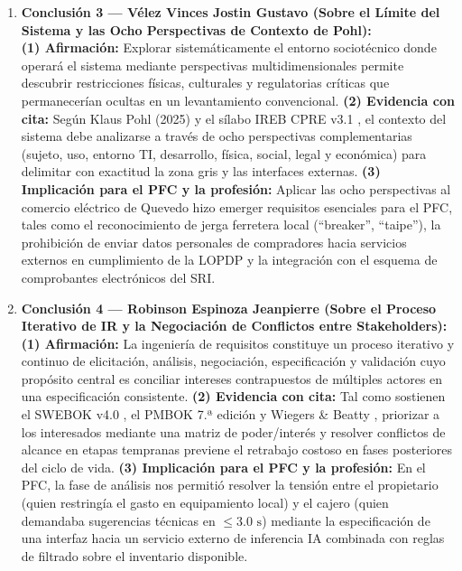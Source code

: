 \documentclass[conference,10pt]{IEEEtran}
\begin{document}
\begin{enumerate}
		\item \textbf{Conclusión 3 --- Vélez Vinces Jostin Gustavo (Sobre el Límite del Sistema y las Ocho Perspectivas de Contexto de Pohl):} \\
		\textbf{(1) Afirmación:} Explorar sistemáticamente el entorno sociotécnico donde operará el sistema mediante perspectivas multidimensionales permite descubrir restricciones físicas, culturales y regulatorias críticas que permanecerían ocultas en un levantamiento convencional. \textbf{(2) Evidencia con cita:} Según Klaus Pohl (2025) \cite{pohl2025} y el sílabo IREB CPRE v3.1 \cite{ireb2023}, el contexto del sistema debe analizarse a través de ocho perspectivas complementarias (sujeto, uso, entorno TI, desarrollo, física, social, legal y económica) para delimitar con exactitud la zona gris y las interfaces externas. \textbf{(3) Implicación para el PFC y la profesión:} Aplicar las ocho perspectivas al comercio eléctrico de Quevedo hizo emerger requisitos esenciales para el PFC, tales como el reconocimiento de jerga ferretera local (``breaker'', ``taipe''), la prohibición de enviar datos personales de compradores hacia servicios externos en cumplimiento de la LOPDP y la integración con el esquema de comprobantes electrónicos del SRI.
		
		\item \textbf{Conclusión 4 --- Robinson Espinoza Jeanpierre (Sobre el Proceso Iterativo de IR y la Negociación de Conflictos entre Stakeholders):} \\
		\textbf{(1) Afirmación:} La ingeniería de requisitos constituye un proceso iterativo y continuo de elicitación, análisis, negociación, especificación y validación cuyo propósito central es conciliar intereses contrapuestos de múltiples actores en una especificación consistente. \textbf{(2) Evidencia con cita:} Tal como sostienen el SWEBOK v4.0 \cite{swebok2024}, el PMBOK 7.ª edición \cite{pmbok} y Wiegers \& Beatty \cite{wiegers2013}, priorizar a los interesados mediante una matriz de poder/interés y resolver conflictos de alcance en etapas tempranas previene el retrabajo costoso en fases posteriores del ciclo de vida. \textbf{(3) Implicación para el PFC y la profesión:} En el PFC, la fase de análisis nos permitió resolver la tensión entre el propietario (quien restringía el gasto en equipamiento local) y el cajero (quien demandaba sugerencias técnicas en $\le 3.0\text{ s}$) mediante la especificación de una interfaz hacia un servicio externo de inferencia IA combinada con reglas de filtrado sobre el inventario disponible.
		

\end{enumerate}
\end{document}
